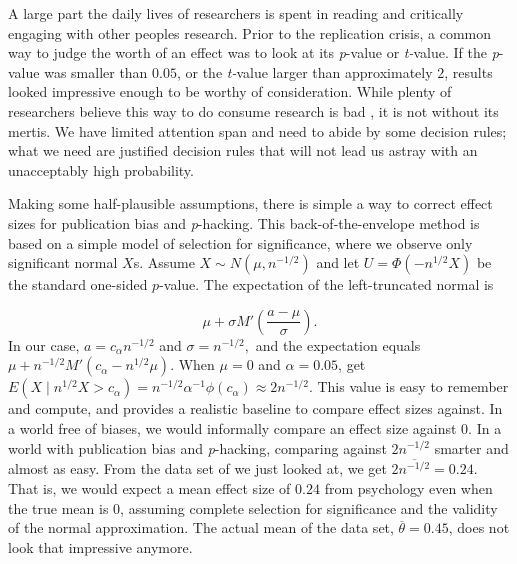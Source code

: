 A large part the daily lives of researchers is spent in reading and
critically engaging with other peoples research. Prior to the replication
crisis, a common way to judge the worth of an effect was to look at
its \emph{p}-value or \emph{t-}value. If the \emph{p}-value was smaller
than $0.05$, or the \emph{t-}value larger than approximately $2$,
results looked impressive enough to be worthy of consideration. While
plenty of researchers believe this way to do consume research is bad
\parencite{Gigerenzer2004-oc}, it is not without its mertis. We have
limited attention span and need to abide by some decision rules; what
we need are justified decision rules that will not lead us astray
with an unacceptably high probability.

Making some half-plausible assumptions, there is simple a way to correct
effect sizes for publication bias and \emph{p}-hacking. This back-of-the-envelope
method is based on a simple model of selection for significance, where
we observe only significant normal $X$s. Assume $X\sim N(\mu,n^{-1/2})$
and let $U=\Phi(-n^{1/2}X)$ be the standard one-sided $p$-value.
The expectation of the left-truncated normal is \parencite[Section 10.1]{Johnson1994-ag}

\begin{equation}
\mu+\sigma M'\left(\frac{a-\mu}{\sigma}\right).\label{eq:mean of truncated normal}
\end{equation}
In our case, $a=c_{\alpha}n^{-1/2}$ and $\sigma=n^{-1/2},$ and the
expectation equals $\mu+n^{-1/2}M'(c_{\alpha}-n^{1/2}\mu)$. When
$\mu=0$ and $\alpha=0.05$, get $E(X\mid n^{1/2}X>c_{\alpha})=n^{-1/2}\alpha^{-1}\phi(c_{\alpha})\approx2n^{-1/2}.$
This value is easy to remember and compute, and provides a realistic
baseline to compare effect sizes against. In a world free of biases,
we would informally compare an effect size against $0$. In a world
with publication bias and \emph{p}-hacking, comparing against $2n^{-1/2}$
smarter and almost as easy. From the data set of \cite{Motyl2017-dx}
we just looked at, we get $2\overline{n^{-1/2}}=0.24$. That is, we
would expect a mean effect size of $0.24$ from psychology even when
the true mean is $0$, assuming complete selection for significance
and the validity of the normal approximation. The actual mean of the
data set, $\overline{\theta}=0.45$, does not look that impressive
anymore.

